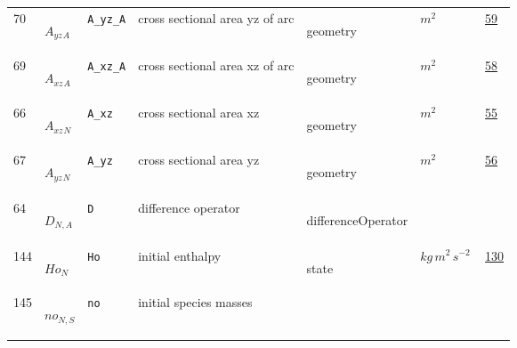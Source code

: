 \begin{longtable}{|p{1cm}|p{2.5cm}|p{4.5cm}|p{8cm}|p{3.0cm}|p{3cm}|p{1cm}|}
                 \\
            70
             & \hypertarget{"v:70"}{ $ {{A_{yz}}}{_{A}} $}
             & \verb|A_yz_A|
             & cross sectional area yz of arc
             & \begin{lay}geometry \end{lay}
             & $ m^{2} \, $
             &                 \hyperlink{"e:59"}{ 59 }
                 \\
            69
             & \hypertarget{"v:69"}{ $ {{A_{xz}}}{_{A}} $}
             & \verb|A_xz_A|
             & cross sectional area xz of arc
             & \begin{lay}geometry \end{lay}
             & $ m^{2} \, $
             &                 \hyperlink{"e:58"}{ 58 }
                 \\
            66
             & \hypertarget{"v:66"}{ $ {{A_{xz}}}{_{N}} $}
             & \verb|A_xz|
             & cross sectional area xz
             & \begin{lay}geometry \end{lay}
             & $ m^{2} \, $
             &                 \hyperlink{"e:55"}{ 55 }
                 \\
            67
             & \hypertarget{"v:67"}{ $ {{A_{yz}}}{_{N}} $}
             & \verb|A_yz|
             & cross sectional area yz
             & \begin{lay}geometry \end{lay}
             & $ m^{2} \, $
             &                 \hyperlink{"e:56"}{ 56 }
                 \\
            64
             & \hypertarget{"v:64"}{ $ {D}{_{N, A}} $}
             & \verb|D|
             & difference operator
             & \begin{lay}differenceOperator \end{lay}
             & $  $
             & \\
            144
             & \hypertarget{"v:144"}{ $ {Ho}{_{N}} $}
             & \verb|Ho|
             & initial enthalpy
             & \begin{lay}state \end{lay}
             & $ kg \,m^{2} \,s^{-2} \, $
             &                 \hyperlink{"e:130"}{ 130 }
                 \\
            145
             & \hypertarget{"v:145"}{ $ {no}{_{N, S}} $}
             & \verb|no|
             & initial species masses

\end{longtable}
